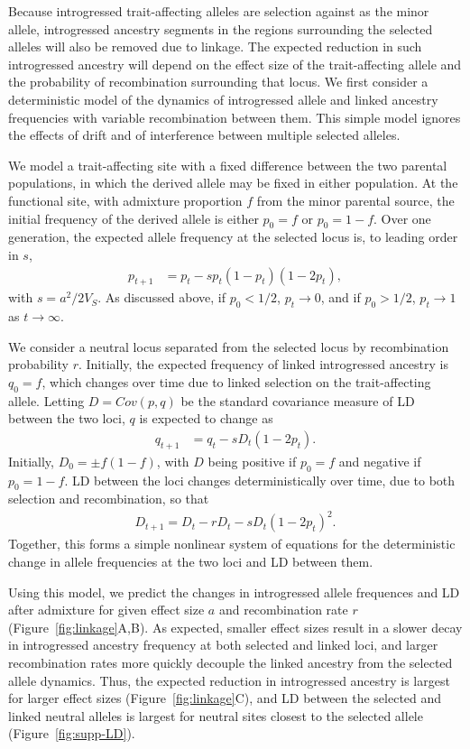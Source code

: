 \documentclass{article}
\begin{document}
Because introgressed trait-affecting alleles are selection against as the minor
allele, introgressed ancestry segments in the regions surrounding the selected
alleles will also be removed due to linkage. The expected reduction in such
introgressed ancestry will depend on the effect size of the trait-affecting
allele and the probability of recombination surrounding that locus. We first
consider a deterministic model of the dynamics of introgressed allele and
linked ancestry frequencies with variable recombination between them. This
simple model ignores the effects of drift and of interference between multiple
selected alleles.

We model a trait-affecting site with a fixed difference between the two
parental populations, in which the derived allele may be fixed in either
population. At the functional site, with admixture proportion $f$ from the
minor parental source, the initial frequency of the derived allele is either
$p_0=f$ or $p_0=1-f$. Over one generation, the expected allele frequency at the
selected locus is, to leading order in $s$,
\begin{align}\label{eq:system-p}
    p_{t+1} & = p_t - s p_t(1-p_t)(1-2p_t),
\end{align}
with
\(s=a^2/2V_S\). As discussed above, if \(p_0<1/2\), \(p_t\rightarrow0\), and if
\(p_0>1/2\), \(p_t\rightarrow1\) as \(t\rightarrow\infty\).

We consider a neutral locus separated from the selected locus by recombination
probability $r$. Initially, the expected frequency of linked introgressed
ancestry is \(q_0=f\), which changes over time due to linked selection on the
trait-affecting allele. Letting \(D=Cov(p,q)\) be the standard covariance
measure of LD between the two loci, $q$ is expected to change as
\begin{align}\label{eq:system-q}
    q_{t+1} & = q_t - s D_t(1-2p_t).
\end{align}
Initially, \(D_0=\pm f(1-f)\), with \(D\) being
positive if \(p_0=f\) and negative if \(p_0=1-f\). LD between the loci changes
deterministically over time, due to both selection and recombination, so that
\begin{align}\label{eq:system-D}
    D_{t+1} = D_t - r D_t - s D_t (1-2p_t)^2.
\end{align}
Together, this forms a
simple nonlinear system of equations for the deterministic change in allele
frequencies at the two loci and LD between them.

Using this model, we predict the changes in introgressed allele frequences and
LD after admixture for given effect size $a$ and recombination rate $r$
(Figure~\ref{fig:linkage}A,B). As expected, smaller effect sizes result in a
slower decay in introgressed ancestry frequency at both selected and linked
loci, and larger recombination rates more quickly decouple the linked ancestry
from the selected allele dynamics. Thus, the expected reduction in introgressed
ancestry is largest for larger effect sizes (Figure~\ref{fig:linkage}C),
and LD between the selected and linked neutral alleles is largest for neutral
sites closest to the selected allele (Figure~\ref{fig:supp-LD}).
\end{document}
